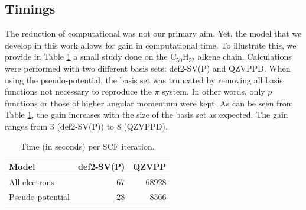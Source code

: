 \documentclass[aip,reprint]{revtex4-1}
\begin{document}
\subsection{Timings}
The reduction of computational was not our primary aim.
Yet, the model that we develop in this work allows for gain in computational time.
To illustrate this, we provide in Table \ref{tab:time} a small study done on the C$_{50}$H$_{52}$
alkene chain.
Calculations were performed with two different basis sets: def2-SV(P) and QZVPPD.
When using the pseudo-potential, the basis set was truncated by removing all
basis functions not necessary to reproduce the
$\pi$ system.
In other words, only $p$ functions or those of higher angular momentum were kept.
As can be seen from Table \ref{tab:time}, the gain increases
with the size of the basis set as expected.
The gain ranges from 3 (def2-SV(P)) to 8 (QZVPPD).

\begin{table}[ht]
\begin{tabular}{lrr}
\hline\hline
Model            & def2-SV(P) & QZVPP \\
\hline
All electrons    &        67 & 68928 \\
Pseudo-potential &        28 &  8566 \\
\hline\hline
\end{tabular}
\caption{\label{tab:time}Time (in seconds) per SCF iteration.} 
\end{table}
\end{document}
